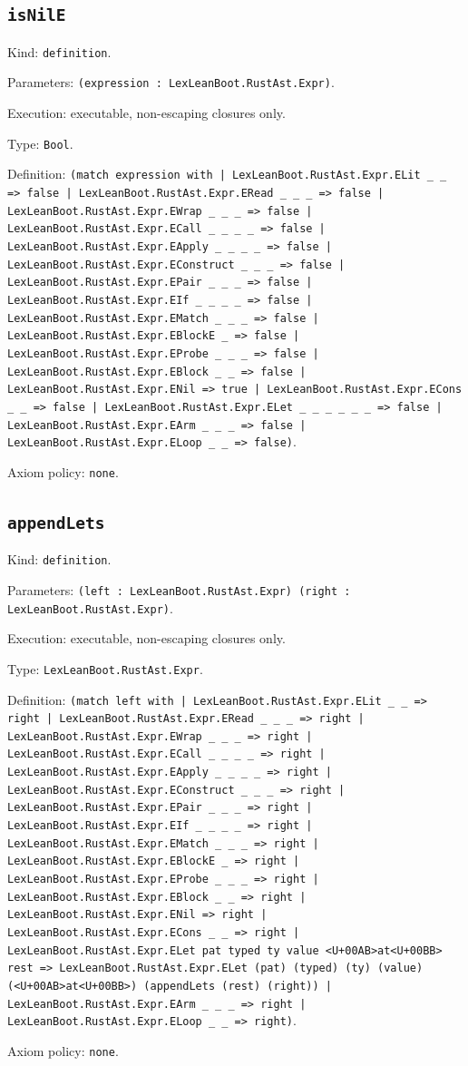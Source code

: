 \documentclass[11pt]{article}
\begin{document}
\subsection*{\texttt{isNilE}}
\noindent Kind: \texttt{definition}.\par
\noindent Parameters: \texttt{(expression : LexLeanBoot.RustAst.Expr)}.\par
\noindent Execution: executable, non-escaping closures only.\par
\noindent Type: \texttt{Bool}.\par
\noindent Definition: \texttt{(match expression with | LexLeanBoot.RustAst.Expr.ELit \_ \_ => false | LexLeanBoot.RustAst.Expr.ERead \_ \_ \_ => false | LexLeanBoot.RustAst.Expr.EWrap \_ \_ \_ => false | LexLeanBoot.RustAst.Expr.ECall \_ \_ \_ \_ => false | LexLeanBoot.RustAst.Expr.EApply \_ \_ \_ \_ => false | LexLeanBoot.RustAst.Expr.EConstruct \_ \_ \_ => false | LexLeanBoot.RustAst.Expr.EPair \_ \_ \_ => false | LexLeanBoot.RustAst.Expr.EIf \_ \_ \_ \_ => false | LexLeanBoot.RustAst.Expr.EMatch \_ \_ \_ => false | LexLeanBoot.RustAst.Expr.EBlockE \_ => false | LexLeanBoot.RustAst.Expr.EProbe \_ \_ \_ => false | LexLeanBoot.RustAst.Expr.EBlock \_ \_ => false | LexLeanBoot.RustAst.Expr.ENil => true | LexLeanBoot.RustAst.Expr.ECons \_ \_ => false | LexLeanBoot.RustAst.Expr.ELet \_ \_ \_ \_ \_ \_ => false | LexLeanBoot.RustAst.Expr.EArm \_ \_ \_ => false | LexLeanBoot.RustAst.Expr.ELoop \_ \_ => false)}.\par
\noindent Axiom policy: \texttt{none}.\par
\subsection*{\texttt{appendLets}}
\noindent Kind: \texttt{definition}.\par
\noindent Parameters: \texttt{(left : LexLeanBoot.RustAst.Expr) (right : LexLeanBoot.RustAst.Expr)}.\par
\noindent Execution: executable, non-escaping closures only.\par
\noindent Type: \texttt{LexLeanBoot.RustAst.Expr}.\par
\noindent Definition: \texttt{(match left with | LexLeanBoot.RustAst.Expr.ELit \_ \_ => right | LexLeanBoot.RustAst.Expr.ERead \_ \_ \_ => right | LexLeanBoot.RustAst.Expr.EWrap \_ \_ \_ => right | LexLeanBoot.RustAst.Expr.ECall \_ \_ \_ \_ => right | LexLeanBoot.RustAst.Expr.EApply \_ \_ \_ \_ => right | LexLeanBoot.RustAst.Expr.EConstruct \_ \_ \_ => right | LexLeanBoot.RustAst.Expr.EPair \_ \_ \_ => right | LexLeanBoot.RustAst.Expr.EIf \_ \_ \_ \_ => right | LexLeanBoot.RustAst.Expr.EMatch \_ \_ \_ => right | LexLeanBoot.RustAst.Expr.EBlockE \_ => right | LexLeanBoot.RustAst.Expr.EProbe \_ \_ \_ => right | LexLeanBoot.RustAst.Expr.EBlock \_ \_ => right | LexLeanBoot.RustAst.Expr.ENil => right | LexLeanBoot.RustAst.Expr.ECons \_ \_ => right | LexLeanBoot.RustAst.Expr.ELet pat typed ty value <U+00AB>at<U+00BB> rest => LexLeanBoot.RustAst.Expr.ELet (pat) (typed) (ty) (value) (<U+00AB>at<U+00BB>) (appendLets (rest) (right)) | LexLeanBoot.RustAst.Expr.EArm \_ \_ \_ => right | LexLeanBoot.RustAst.Expr.ELoop \_ \_ => right)}.\par
\noindent Axiom policy: \texttt{none}.\par
\end{document}

